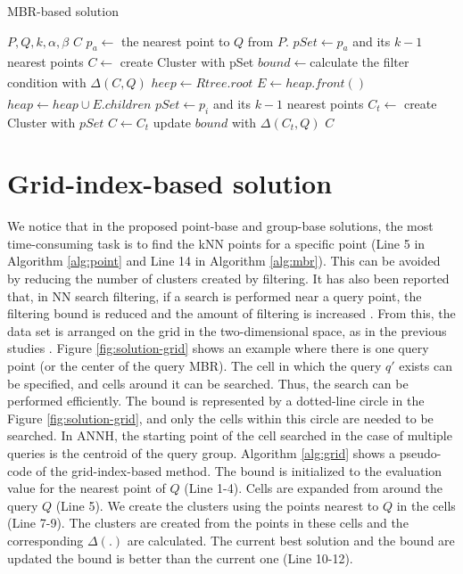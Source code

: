 \documentclass[a4paper,11pt]{report}
\theoremstyle{mytheoremstyle}
\begin{document}
\begin{algorithm}
\caption{MBR-based solution}         
\label{alg:mbr}
\begin{algorithmic}[1]                  
\renewcommand{\algorithmicrequire}{\textbf{Input:}}
\renewcommand{\algorithmicensure}{\textbf{Output:}}
\REQUIRE $P,Q,k,\alpha, \beta$
\ENSURE $C$
\STATE $p_a \xleftarrow[]{}$ the nearest point to $Q$ from $P$.
\STATE $pSet \xleftarrow{} p_a$ and its $k-1$ nearest points
\STATE $C \xleftarrow[]{}$ create Cluster with pSet
\STATE $bound \xleftarrow[]{} $calculate the filter condition with $\Delta(C,Q)$
\STATE $heep \xleftarrow[]{} Rtree.root$
\STATE $E \xleftarrow[]{}heap.front()$
\STATE $heap \xleftarrow{} heap \cup E.children$
\ENDIF
{}
\STATE $pSet \xleftarrow{} p_i$ and its $k-1$ nearest points
\STATE $C_t \xleftarrow{}$ create Cluster with $pSet$
\STATE $C \xleftarrow{} C_t$
\STATE update $bound$ with $\Delta(C_t,Q)$
\ENDIF
\ENDIF
\ENDFOR
\ENDIF
\ENDIF
\ENDWHILE
\RETURN $C$
\end{algorithmic}
\end{algorithm}

\section{Grid-index-based solution}

We notice that in the proposed point-base and group-base solutions, the most time-consuming task is to find the kNN points for a specific point (Line 5 in Algorithm \ref{alg:point} and Line 14 in Algorithm \ref{alg:mbr}). This can be avoided by reducing the number of clusters created by filtering. It has also been reported that, in NN search filtering, if a search is performed near a query point, the filtering bound is reduced and the amount of filtering is increased \cite{BNNH}. From this, the data set is arranged on the grid in the two-dimensional space, as in the previous studies \cite{BNNH,weber1998quantitative,mouratidis2006continuous,yu2005monitoring,mouratidis2005conceptual,xiong2005sea}. Figure \ref{fig:solution-grid} shows an example where there is one query point (or the center of the query MBR). The cell in which the query $q'$ exists can be specified, and cells around it can be searched. Thus, the search can be performed efficiently. The bound is represented by a dotted-line circle in the Figure \ref{fig:solution-grid}, and only the cells within this circle are needed to be searched. In ANNH, the starting point of the cell searched in the case of multiple queries is the centroid of the query group. Algorithm \ref{alg:grid} shows a pseudo-code of the grid-index-based method. The bound is initialized to the evaluation value for the nearest point of $Q$ (Line 1-4). Cells are expanded from around the query $Q$ (Line 5). We create the clusters using the points nearest to $Q$ in the cells (Line 7-9). The clusters are created from the points in these cells and the corresponding $\Delta(.)$ are calculated. The current best solution and the bound are updated the bound is better than the current one (Line 10-12). 
\end{document}
